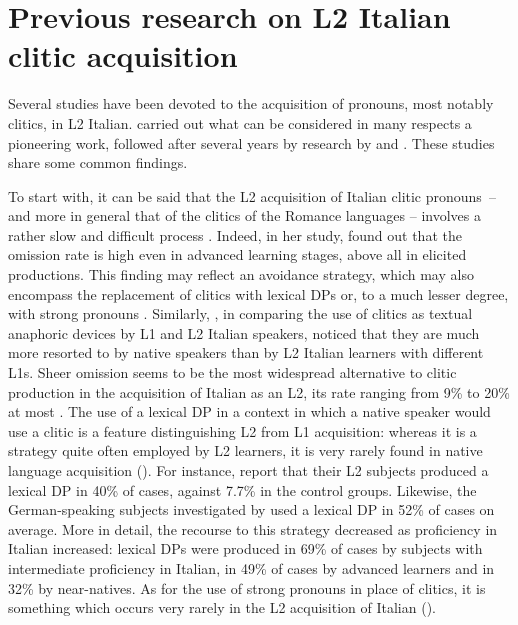 \documentclass[output=paper,modfonts,nonflat,newtxmath]{langsci/langscibook}
\begin{document}
\section{{Previous} {research} {on} {L2} {Italian} {clitic} acquisition} %
\label{sec:sciutti:3}

Several studies have been devoted to the acquisition of pronouns, most notably clitics, in L2 Italian. \citet{Berretta1986} carried out what can be considered in many respects a pioneering work, followed after several years by research by \citet{LeoniniBelletti2004, GianniniCancila2006, Santoro2007, Giannini2008} and \citet{Maffei2009}. These studies share some common findings.

To start with, it can be said that the L2 acquisition of Italian clitic pronouns~– and more in general that of the clitics of the Romance languages – involves a rather slow and difficult process \citet{BruhnMontrul1996, White1996, DuffieldWhite1999, DuffieldEtAl2002, Santoro2007}. Indeed, in her study, \citet{Giannini2008} found out that the omission rate is high even in advanced learning stages, above all in elicited productions. This finding may reflect an avoidance strategy, which may also encompass the replacement of clitics with lexical DPs or, to a much lesser degree, with strong pronouns \citet{LeoniniBelletti2004}. Similarly, \citet[191]{ChiniEtAl2003}, in comparing the use of clitics as textual anaphoric devices by L1 and L2 Italian speakers, noticed that they are much more resorted to by native speakers than by L2 Italian learners with different L1s. Sheer omission seems to be the most widespread alternative to clitic production in the acquisition of Italian as an L2, its rate ranging from 9\% to 20\% at most \citet{BellettiGuasti2015}. The use of a lexical DP in a context in which a native speaker would use a clitic is a feature distinguishing L2 from L1 acquisition: whereas it is a strategy quite often employed by L2 learners, it is very rarely found in native language acquisition (\citealt{BellettiGuasti2015}). For instance, \citet{LeoniniBelletti2004} report that their L2 subjects produced a lexical DP in 40\% of cases, against 7.7\% in the control groups. Likewise, the German-speaking subjects investigated by \citet{Leonini2006} used a lexical DP in 52\% of cases on average. More in detail, the recourse to this strategy decreased as proficiency in Italian increased: lexical DPs were produced in 69\% of cases by subjects with intermediate proficiency in Italian, in 49\% of cases by advanced learners and in 32\% by near-natives. As for the use of strong pronouns in place of clitics, it is something which occurs very rarely in the L2 acquisition of Italian (\citealt{BellettiGuasti2015}).
\end{document}
